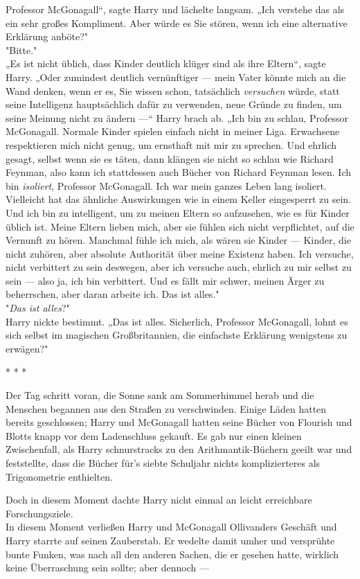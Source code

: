 {Professor McGonagall“, sagte Harry und lächelte langsam. „Ich verstehe das als ein sehr großes Kompliment. Aber würde es Sie stören, wenn ich eine alternative Erklärung anböte?"\\ "Bitte."\\ „Es ist nicht üblich, dass Kinder deutlich klüger sind als ihre Eltern“, sagte Harry. „Oder zumindest deutlich vernünftiger --- mein Vater könnte mich an die Wand denken, wenn er es, Sie wissen schon, tatsächlich \emph{versuchen} würde, statt seine Intelligenz hauptsächlich dafür zu verwenden, neue Gründe zu finden, um seine Meinung nicht zu ändern ---“ Harry brach ab. „Ich bin zu schlau, Professor McGonagall. Normale Kinder spielen einfach nicht in meiner Liga. Erwachsene respektieren mich nicht genug, um ernsthaft mit mir zu sprechen. Und ehrlich gesagt, selbst wenn sie es täten, dann klängen sie nicht so schlau wie Richard Feynman, also kann ich stattdessen auch Bücher von Richard Feynman lesen. Ich bin \emph{isoliert}, Professor McGonagall. Ich war mein ganzes Leben lang isoliert. Vielleicht hat das ähnliche Auswirkungen wie in einem Keller eingesperrt zu sein. Und ich bin zu intelligent, um zu meinen Eltern so aufzusehen, wie es für Kinder üblich ist. Meine Eltern lieben mich, aber sie fühlen sich nicht verpflichtet, auf die Vernunft zu hören. Manchmal fühle ich mich, als wären sie Kinder --- Kinder, die nicht zuhören, aber absolute Authorität über meine Existenz haben. Ich versuche, nicht verbittert zu sein deswegen, aber ich versuche auch, ehrlich zu mir selbst zu sein --- also ja, ich bin verbittert. Und es fällt mir schwer, meinen Ärger zu beherrschen, aber daran arbeite ich. Das ist alles."\\ "\emph{Das ist alles}?"\\ Harry nickte bestimmt. „Das ist alles. Sicherlich, Professor McGonagall, lohnt es sich selbst im magischen Großbritannien, die einfachste Erklärung wenigstens zu erwägen?"

* * *

Der Tag schritt voran, die Sonne sank am Sommerhimmel herab und die Menschen begannen aus den Straßen zu verschwinden. Einige Läden hatten bereits geschlossen; Harry und McGonagall hatten seine Bücher von Flourish und Blotts knapp vor dem Ladenschluss gekauft. Es gab nur einen kleinen Zwischenfall, als Harry schnurstracks zu den Arithmantik-Büchern geeilt war und feststellte, dass die Bücher für's siebte Schuljahr nichts komplizierteres als Trigonometrie enthielten.

Doch in diesem Moment dachte Harry nicht einmal an leicht erreichbare Forschungsziele.\\ In diesem Moment verließen Harry und McGonagall Ollivanders Geschäft und Harry starrte auf seinen Zauberstab. Er wedelte damit umher und versprühte bunte Funken, was nach all den anderen Sachen, die er gesehen hatte, wirklich keine Überraschung sein sollte; aber dennoch ---

}
